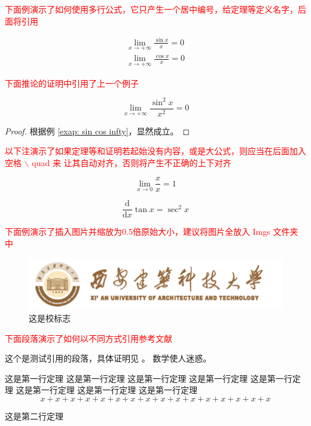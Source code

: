 \textcolor{red}{下面例演示了如何使用多行公式，它只产生一个居中编号，给定理等定义名字，后面将引用}
\begin{example}\label{exap: sin cos infty}
    \begin{equation}
        \begin{aligned}
            \lim_{x\to +\infty} \frac{\sin x}{x} = 0 \\
            \lim_{x\to +\infty} \frac{\cos x}{x} = 0
        \end{aligned}
    \end{equation}
\end{example}

\textcolor{red}{下面推论的证明中引用了上一个例子}
\begin{corollary}
    \[
        \lim_{x\to +\infty} \frac{\sin^2 x}{x^2} = 0
    \]

    \begin{proof}
        根据例 \ref{exap: sin cos infty}，显然成立。
    \end{proof}
\end{corollary}

\textcolor{red}{以下注演示了如果定理等和证明若起始没有内容，或是大公式，则应当在后面加入空格 $\backslash$ quad 来 让其自动对齐，否则将产生不正确的上下对齐}
\begin{remark} \quad
    \[
        \lim_{x\to 0} \frac{x}{x} = 1
    \]
\end{remark}

\begin{equation}
    \frac{\mathrm{d}}{\mathrm{d}x} \tan x = \sec^2 x
\end{equation}

\textcolor{red}{下面例演示了插入图片并缩放为0.5倍原始大小，建议将图片全放入 Imgs 文件夹中}

\begin{figure}[h]
    \centering
    \includegraphics[scale=0.5]{Imgs/xiaoming.png}
    \caption{这是校标志}
\end{figure}

\textcolor{red}{下面段落演示了如何以不同方式引用参考文献}

这个是测试引用的段落\cite{Ibrahim2022}，具体证明见 \cite[定理 8]{SB2077}。
数学使人迷惑\supercite{SB2077}。

\begin{theorem}
    这是第一行定理
    这是第一行定理
    这是第一行定理
    这是第一行定理
    这是第一行定理
    这是第一行定理
    这是第一行定理
    这是第一行定理
    \[
        x + x + x + x +
        x + x + x + x +
        x + x + x + x +
        x + x + x + x
    \]
\end{theorem}

\begin{theorem}
    这是第二行定理
\end{theorem}


